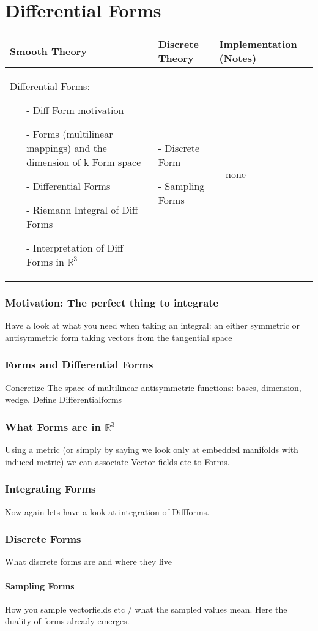 \chapter{Differential Forms}
	\begin{longtable}{|p{4.5cm}|p{4.5cm}|p{4.5cm}|}
		\hline
		Smooth Theory& Discrete Theory& Implementation (Notes)\\
		\hline
			Differential Forms: \begin{itemize}
			  \setlength{\itemsep}{1pt}
			  \setlength{\parskip}{0pt}
				\setlength{\parsep}{0pt}
				\item[-]Diff Form motivation
				\item[-]Forms (multilinear mappings) and the dimension of k Form space 
				\item[-]Differential Forms 
				\item[-]Riemann Integral of Diff Forms 
				\item[-]Interpretation of Diff Forms in $\mathbb R^3$ 
			\end{itemize}
			&
			\begin{packed_enum}
				\item[-] Discrete Form
				\item[-] Sampling Forms
			\end{packed_enum}
			 & - none
			 \\		
		\hline
	\end{longtable}
	\subsection{Motivation: The perfect thing to integrate}
		Have a look at what you need when taking an integral: an either symmetric or antisymmetric form taking
		vectors from the tangential space
	\subsection{Forms and Differential Forms}
		Concretize The space of multilinear antisymmetric functions: bases, dimension, wedge. Define Differentialforms
	\subsection{What Forms are in $\mathbb{R}^3$}
		Using a metric (or simply by saying we look only at embedded manifolds with induced metric) we can associate
		Vector fields etc to Forms.
	\subsection{Integrating Forms}
		Now again lets have a look at integration of Diffforms.
	\subsection{Discrete Forms}
		What discrete forms are and where they live
	\subsubsection{Sampling Forms}
		How you sample vectorfields etc / what the sampled values mean. Here the duality of forms already emerges.
	